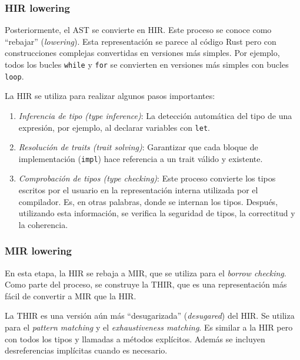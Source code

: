 \subsubsection{HIR lowering}

Posteriormente, el \acrshort{AST} se convierte en \acrfull{HIR}. Este
proceso se conoce como ``rebajar'' (\textit{lowering}).
Esta representación se parece al código Rust pero con
construcciones complejas convertidas en versiones más simples.
Por ejemplo, todos los bucles \texttt{while} y \texttt{for} se convierten en
versiones más simples con bucles \texttt{loop}.

La \acrshort{HIR} se utiliza para realizar algunos pasos importantes:

\begin{enumerate}
      \item \emph{Inferencia de tipo (type inference)}: La detección automática del tipo de una expresión, por ejemplo, al
            declarar variables con \texttt{let}.
      \item \emph{Resolución de traits (trait solving)}: Garantizar que cada bloque de implementación (\texttt{impl}) hace
            referencia a un trait válido y existente.
      \item \emph{Comprobación de tipos (type checking)}: Este proceso convierte los tipos escritos por el usuario en la
            representación interna utilizada por el compilador. Es, en otras palabras, donde se
            internan los tipos. Después, utilizando esta información, se verifica la seguridad de tipos,
            la correctitud y la coherencia.
\end{enumerate}

\subsubsection{MIR lowering}

En esta etapa, la \acrshort{HIR} se rebaja a \acrfull{MIR}, que se
utiliza para el \emph{borrow checking}. Como parte del proceso, se construye la
\acrfull{THIR}, que es una representación más
fácil de convertir a \acrshort{MIR} que la \acrshort{HIR}.

La \acrshort{THIR} es una versión aún más ``desugarizada'' (\emph{desugared}) del \acrshort{HIR}.
Se utiliza para el \textit{pattern matching} y el \textit{exhaustiveness matching}.
Es similar a la \acrshort{HIR} pero con todos los tipos y llamadas a métodos explícitos.
Además se incluyen desreferencias implícitas cuando es necesario.

